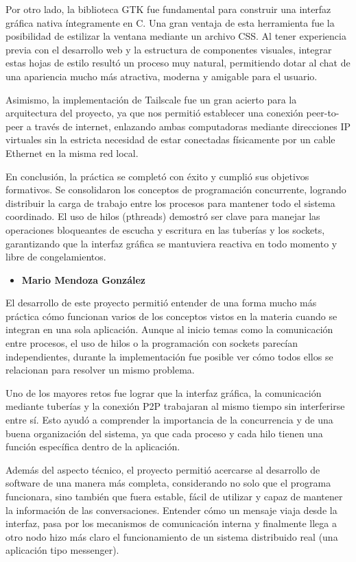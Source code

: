\documentclass[12pt]{article}
\begin{document}
Por otro lado, la biblioteca GTK fue fundamental para construir una interfaz gráfica nativa íntegramente en C. Una gran ventaja de esta herramienta fue la posibilidad de estilizar la ventana mediante un archivo CSS. Al tener experiencia previa con el desarrollo web y la estructura de componentes visuales, integrar estas hojas de estilo resultó un proceso muy natural, permitiendo dotar al chat de una apariencia mucho más atractiva, moderna y amigable para el usuario.

Asimismo, la implementación de Tailscale fue un gran acierto para la arquitectura del proyecto, ya que nos permitió establecer una conexión peer-to-peer a través de internet, enlazando ambas computadoras mediante direcciones IP virtuales sin la estricta necesidad de estar conectadas físicamente por un cable Ethernet en la misma red local.

En conclusión, la práctica se completó con éxito y cumplió sus objetivos formativos. Se consolidaron los conceptos de programación concurrente, logrando distribuir la carga de trabajo entre los procesos para mantener todo el sistema coordinado. El uso de hilos (pthreads) demostró ser clave para manejar las operaciones bloqueantes de escucha y escritura en las tuberías y los sockets, garantizando que la interfaz gráfica se mantuviera reactiva en todo momento y libre de congelamientos.

\newpage
\begin{itemize}
    \item \textbf{Mario Mendoza González}
\end{itemize}
El desarrollo de este proyecto permitió entender de una forma mucho más práctica cómo funcionan varios de los conceptos vistos en la materia cuando se integran en una sola aplicación. Aunque al inicio temas como la comunicación entre procesos, el uso de hilos o la programación con sockets parecían independientes, durante la implementación fue posible ver cómo todos ellos se relacionan para resolver un mismo problema.

Uno de los mayores retos fue lograr que la interfaz gráfica, la comunicación mediante tuberías y la conexión P2P trabajaran al mismo tiempo sin interferirse entre sí. Esto ayudó a comprender la importancia de la concurrencia y de una buena organización del sistema, ya que cada proceso y cada hilo tienen una función específica dentro de la aplicación.

Además del aspecto técnico, el proyecto permitió acercarse al desarrollo de software de una manera más completa, considerando no solo que el programa funcionara, sino también que fuera estable, fácil de utilizar y capaz de mantener la información de las conversaciones. Entender cómo un mensaje viaja desde la interfaz, pasa por los mecanismos de comunicación interna y finalmente llega a otro nodo hizo más claro el funcionamiento de un sistema distribuido real (una aplicación tipo messenger).
\end{document}
